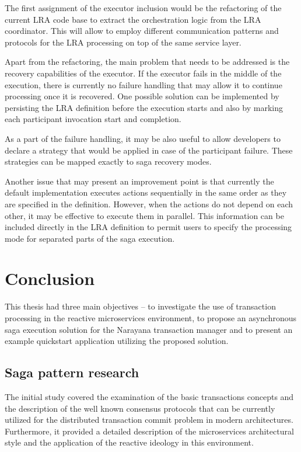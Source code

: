 \documentclass[oneside,
  digital, %
  table,   %
  lof,     %
  lot,     %
]{fithesis3}
\begin{document}
The first assignment of the executor inclusion would be the refactoring of the current LRA code base to extract the orchestration logic from the LRA coordinator. This will allow to employ different communication patterns and protocols for the LRA processing on top of the same service layer. 

Apart from the refactoring, the main problem that needs to be addressed is the recovery capabilities of the executor. If the executor fails in the middle of the execution, there is currently no failure handling that may allow it to continue processing once it is recovered. One possible solution can be implemented by persisting the LRA definition before the execution starts and also by marking each participant invocation start and completion.

As a part of the failure handling, it may be also useful to allow developers to declare a strategy that would be applied in case of the participant failure. These strategies can be mapped exactly to saga recovery modes. 

Another issue that may present an improvement point is that currently the default implementation executes actions sequentially in the same order as they are specified in the definition. However, when the actions do not depend on each other, it may be effective to execute them in parallel. This information can be included directly in the LRA definition to permit users to specify the processing mode for separated parts of the saga execution.


\clearpage
\chapter{Conclusion}

This thesis had three main objectives -- to investigate the use of transaction processing in the reactive microservices environment, to propose an asynchronous saga execution solution for the Narayana transaction manager and to present an example quickstart application utilizing the proposed solution.

\section{Saga pattern research}

The initial study covered the examination of the basic transactions concepts and the description of the well known consensus protocols that can be currently utilized for the distributed transaction commit problem in modern architectures. Furthermore, it provided a detailed description of the microservices architectural style and the application of the reactive ideology in this environment.
\end{document}
